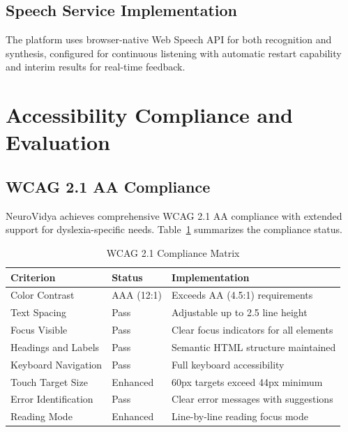 \documentclass[journal]{IEEEtran}
\begin{document}
\subsection{Speech Service Implementation}

The platform uses browser-native Web Speech API for both recognition and synthesis, configured for continuous listening with automatic restart capability and interim results for real-time feedback.

\section{Accessibility Compliance and Evaluation}

\subsection{WCAG 2.1 AA Compliance}

NeuroVidya achieves comprehensive WCAG 2.1 AA compliance with extended support for dyslexia-specific needs. Table~\ref{tab:wcag} summarizes the compliance status.

\begin{table}[h]
\centering
\caption{WCAG 2.1 Compliance Matrix}
\label{tab:wcag}
\begin{tabular}{@{}lll@{}}
\toprule
\textbf{Criterion} & \textbf{Status} & \textbf{Implementation} \\ \midrule
Color Contrast & AAA (12:1) & Exceeds AA (4.5:1) requirements \\
Text Spacing & Pass & Adjustable up to 2.5 line height \\
Focus Visible & Pass & Clear focus indicators for all elements \\
Headings and Labels & Pass & Semantic HTML structure maintained \\
Keyboard Navigation & Pass & Full keyboard accessibility \\
Touch Target Size & Enhanced & 60px targets exceed 44px minimum \\
Error Identification & Pass & Clear error messages with suggestions \\
Reading Mode & Enhanced & Line-by-line reading focus mode \\ \bottomrule
\end{tabular}
\end{table}
\end{document}
